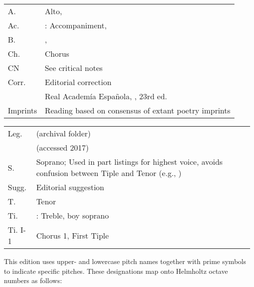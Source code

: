 
\begin{multicols}{2}
    \setlength{\parindent}{0pt}
    \begin{tabu} to \linewidth{lZ}
        A. & Alto, \\
        Ac. & : Accompaniment, \\
        B. & , \\
        Ch. & Chorus\\
        CN & See critical notes\\
        Corr. & Editorial correction\\
         & Real Academía Española, , 23rd ed.\\
        Imprints & Reading based on consensus of extant poetry imprints\\
    \end{tabu}

    \begin{tabu} to \linewidth{lZ}
        Leg. &  (archival folder)\\
         &  (accessed 2017)\\
        S. & Soprano; Used in part listings for highest voice, avoids
        confusion between Tiple and Tenor (e.g., )\\
        Sugg. & Editorial suggestion\\
        T. & Tenor\\
        Ti. & : Treble, boy soprano\\
        Ti. I-1 & Chorus 1, First Tiple\\
    \end{tabu}
\end{multicols}



This edition uses upper- and lowercase pitch names together with prime symbols
to indicate specific pitches.
These designations map onto Helmholtz octave numbers as follows:




